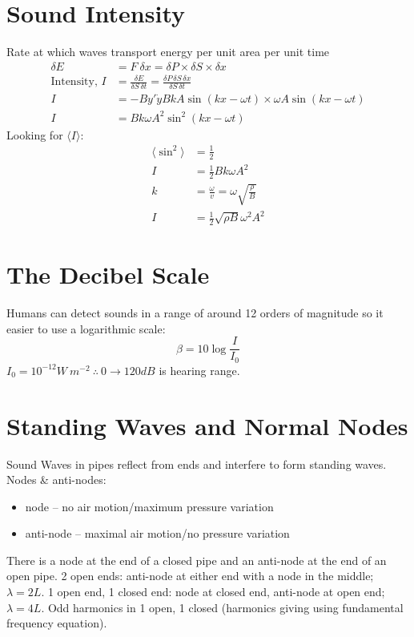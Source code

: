 \documentclass[a4paper, 11pt, normalem]{report}
\begin{document}
\section{Sound Intensity}
Rate at which waves transport energy per unit area per unit time
\begin{align}
    \delta E &= F\:\delta x = \delta P\times \delta S\times \delta x \\
    \text{Intensity, } I &= \frac{\delta E}{\delta S\,\delta t} = \frac{\delta P\,\delta S\,\delta x}{\delta S\,\delta t} \\
    I &= -By'\dot{y} BkA\sin{(kx - \omega t)}\times\omega A\sin{(kx - \omega t)} \\
    I &= Bk\omega A^{2}\sin^{2}{(kx - \omega t)}
\end{align}
Looking for $\langle I\rangle$:
\begin{align}
    \langle\sin^{2}\rangle &= \frac{1}{2} \\
    I &= \frac{1}{2}Bk\omega A^{2} \\
    k &= \frac{\omega}{v} = \omega\sqrt{\frac{\rho}{B}} \\
    I &= \frac{1}{2}\sqrt{\rho B}\omega^{2}A^{2}
\end{align}

\section{The Decibel Scale}
Humans can detect sounds in a range of around 12 orders of magnitude so it easier to use a logarithmic scale:
\begin{equation}
    \beta = 10\log{\frac{I}{I_{0}}}
\end{equation}
$I_{0} = 10^{-12} W\:m^{-2} ~\therefore~ 0 \rightarrow 120dB$ is hearing range.

\section{Standing Waves and Normal Nodes}
Sound Waves in pipes reflect from ends and interfere to form standing waves.
Nodes \& anti-nodes:
\begin{itemize}
    \item node -- no air motion/maximum pressure variation
    \item anti-node -- maximal air motion/no pressure variation
\end{itemize}
There is a node at the end of a closed pipe and an anti-node at the end of an open pipe.
2 open ends: anti-node at either end with a node in the middle; $\lambda = 2L$.
1 open end, 1 closed end: node at closed end, anti-node at open end; $\lambda = 4L$.
Odd harmonics in 1 open, 1 closed (harmonics giving using fundamental frequency equation).
\end{document}
